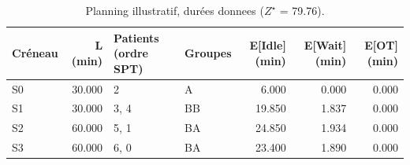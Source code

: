 \begin{table}[htbp]
\caption{Planning illustratif, durées donnees ($Z^\star$ = 79.76).}
\label{tab:planning-donnees}
\begin{tabular}{lrllrrr}
\toprule
Créneau & L (min) & Patients (ordre SPT) & Groupes & E[Idle] (min) & E[Wait] (min) & E[OT] (min) \\
\midrule
S0 & 30.000 & 2 & A & 6.000 & 0.000 & 0.000 \\
S1 & 30.000 & 3, 4 & BB & 19.850 & 1.837 & 0.000 \\
S2 & 60.000 & 5, 1 & BA & 24.850 & 1.934 & 0.000 \\
S3 & 60.000 & 6, 0 & BA & 23.400 & 1.890 & 0.000 \\
\bottomrule
\end{tabular}
\end{table}
